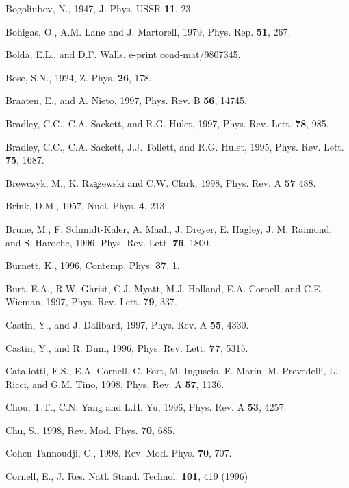 \begin{references}
 Bogoliubov, N., 1947, J. Phys. USSR {\bf 11}, 23.

  Bohigas, O., A.M. Lane and J. Martorell, 1979,
Phys. Rep. {\bf 51}, 267.

  Bolda, E.L., and D.F. Walls, e-print cond-mat/9807345.

     Bose, S.N., 1924, Z. Phys. {\bf 26}, 178.

  Braaten, E., and A. Nieto, 1997, Phys. Rev. B {\bf
56}, 14745.

 Bradley, C.C., C.A. Sackett, and R.G. Hulet, 1997,
Phys. Rev. Lett. {\bf 78}, 985. 

  Bradley, C.C., C.A. Sackett, J.J. Tollett, and R.G.
Hulet, 1995, Phys. Rev. Lett. {\bf 75}, 1687.

       Brewczyk, M., K. Rz\c{a}\.{z}ewski and C.W. Clark,
1998, Phys. Rev. A {\bf 57} 488.

  Brink, D.M., 1957, Nucl. Phys. {\bf 4}, 213. 

    Brune, M., F. Schmidt-Kaler, A. Maali, J. Dreyer,
E. Hagley,  J. M. Raimond, and S. Haroche, 1996,  Phys. Rev. Lett. {\bf
76}, 1800.

  Burnett, K., 1996, Contemp. Phys. {\bf 37}, 1.

     Burt, E.A., R.W. Ghrist, C.J. Myatt, M.J. Holland,
E.A. Cornell, and C.E. Wieman, 1997, Phys. Rev. Lett. {\bf 79}, 337.

   Castin, Y., and J. Dalibard, 1997, Phys. Rev. A
{\bf 55}, 4330.

   Castin, Y., and R. Dum, 1996, Phys. Rev. Lett. {\bf
77}, 5315.

 Cataliotti, F.S., E.A. Cornell, C. Fort, M. Inguscio,
F. Marin, M. Prevedelli, L. Ricci, and G.M. Tino, 1998, Phys. Rev. A {\bf 57},
1136. 

 Chou, T.T., C.N. Yang and L.H. Yu, 1996, Phys. Rev.
A {\bf 53}, 4257.

  Chu, S., 1998, Rev. Mod. Phys. {\bf 70}, 685. 

 Cohen-Tannoudji, C., 1998, Rev. Mod. Phys. {\bf 70}, 707. 

  Cornell, E., J. Res. Natl. Stand. Technol. {\bf
101}, 419 (1996)


\end{references}
